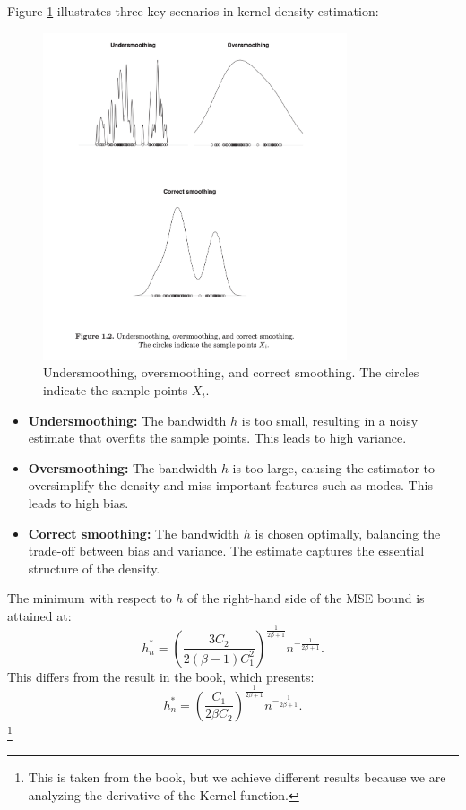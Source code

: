 \documentclass{article}
\begin{document}
Figure \ref{fig:smoothing_graphs} illustrates three key scenarios in kernel density estimation:
\begin{figure}[h]
    \centering
    \includegraphics[width=0.8\textwidth]{graphs_1_nonparametrics.png} %
    \caption{Undersmoothing, oversmoothing, and correct smoothing. The circles indicate the sample points $X_i$.}
    \label{fig:smoothing_graphs}
\end{figure}

\begin{itemize}
    \item \textbf{Undersmoothing:} The bandwidth $h$ is too small, resulting in a noisy estimate that overfits the sample points. This leads to high variance.
    \item \textbf{Oversmoothing:} The bandwidth $h$ is too large, causing the estimator to oversimplify the density and miss important features such as modes. This leads to high bias.
    \item \textbf{Correct smoothing:} The bandwidth $h$ is chosen optimally, balancing the trade-off between bias and variance. The estimate captures the essential structure of the density.
\end{itemize}


The minimum with respect to \( h \) of the right-hand side of the MSE bound is attained at:
\[
    h_n^* = \left( \frac{3C_2}{2(\beta - 1)C_1^2} \right)^{\frac{1}{2\beta + 1}} n^{-\frac{1}{2\beta + 1}}.
\]
This differs from the result in the book, which presents:
\[
    h_n^* = \left( \frac{C_1}{2\beta C_2} \right)^{\frac{1}{2\beta+1}} n^{-\frac{1}{2\beta+1}}.
\]
\footnote{This is taken from the book, but we achieve different results because we are analyzing the derivative of the Kernel function.}
\end{document}
